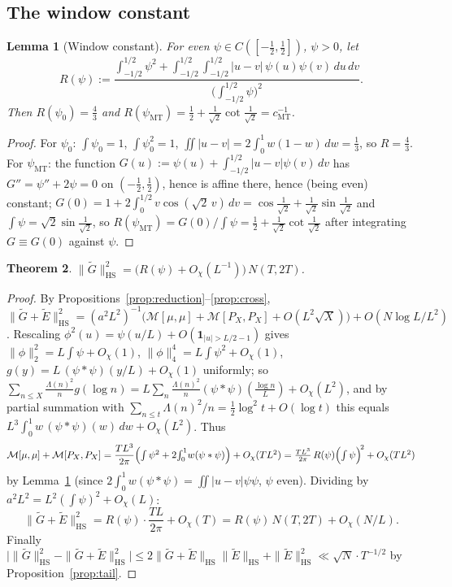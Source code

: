 \documentclass[11pt]{amsart}
\newtheorem{theorem}{Theorem}[section]
\newtheorem{lemma}[theorem]{Lemma}
\theoremstyle{definition}
\theoremstyle{remark}
\numberwithin{equation}{section}
\newcommand{\Gt}{\widetilde{G}}
\newcommand{\Et}{\widetilde{E}}
\newcommand{\one}{\mathbf 1}
\newcommand{\dd}{\,d}
\newcommand{\HS}{\mathrm{HS}}
\begin{document}
\subsection{The window constant}
\begin{lemma}[Window constant]\label{lem:Rpsi}
For even $\psi\in C([-\tfrac12,\tfrac12])$, $\psi>0$, let
\begin{equation}\label{eq:Rpsi}
R(\psi):=\frac{\int_{-1/2}^{1/2}\psi^2+\int_{-1/2}^{1/2}\!\!\int_{-1/2}^{1/2}|u-v|\,\psi(u)\psi(v)\dd u\dd v}{\bigl(\int_{-1/2}^{1/2}\psi\bigr)^2}.
\end{equation}
Then $R(\psi_0)=\tfrac43$ and $R(\psi_{\mathrm{MT}})=\tfrac12+\tfrac1{\sqrt2}\cot\tfrac1{\sqrt2}=c_{\mathrm{MT}}^{-1}$.
\end{lemma}
\begin{proof}
For $\psi_0$: $\int\psi_0=1$, $\int\psi_0^2=1$, $\iint|u-v|=2\int_0^1 w(1-w)\dd w=\tfrac13$, so $R=\tfrac43$. For $\psi_{\mathrm{MT}}$: the function $G(u):=\psi(u)+\int_{-1/2}^{1/2}|u-v|\psi(v)\dd v$ has $G''=\psi''+2\psi=0$ on $(-\tfrac12,\tfrac12)$, hence is affine there, hence (being even) constant; $G(0)=1+2\int_0^{1/2}v\cos(\sqrt2\,v)\dd v=\cos\tfrac1{\sqrt2}+\tfrac1{\sqrt2}\sin\tfrac1{\sqrt2}$ and $\int\psi=\sqrt2\sin\tfrac1{\sqrt2}$, so $R(\psi_{\mathrm{MT}})=G(0)/\!\int\psi=\tfrac12+\tfrac1{\sqrt2}\cot\tfrac1{\sqrt2}$ after integrating $G\equiv G(0)$ against $\psi$.
\end{proof}

\begin{theorem}\label{thm:HS}
$\|\Gt\|_{\HS}^2=\bigl(R(\psi)+O_\chi(L^{-1})\bigr)\,N(T,2T)$.
\end{theorem}
\begin{proof}
By Propositions~\ref{prop:reduction}--\ref{prop:cross}, $\|\Gt+\Et\|_{\HS}^2=(a^2L^2)^{-1}\bigl(\mathcal M[\mu,\mu]+\mathcal M[P_X,P_X]+O(L^2\sqrt X)\bigr)+O(N\log L/L^2)$. Rescaling $\phi^2(u)=\psi(u/L)+O(\one_{|u|>L/2-1})$ gives $\|\phi\|_2^2=L\!\int\psi+O_\chi(1)$, $\|\phi\|_4^4=L\!\int\psi^2+O_\chi(1)$, $g(y)=L\,(\psi*\psi)(y/L)+O_\chi(1)$ uniformly; so $\sum_{n\le X}\tfrac{\Lambda(n)^2}ng(\log n)=L\sum_n\tfrac{\Lambda(n)^2}n(\psi*\psi)(\tfrac{\log n}L)+O_\chi(L^2)$, and by partial summation with $\sum_{n\le t}\Lambda(n)^2/n=\tfrac12\log^2t+O(\log t)$ this equals $L^3\!\int_0^1\!w\,(\psi*\psi)(w)\dd w+O_\chi(L^2)$. Thus
\[
\mathcal M[\mu,\mu]+\mathcal M[P_X,P_X]
=\frac{TL^3}{2\pi}\Bigl(\textstyle\int\psi^2+2\!\int_0^1\!w(\psi*\psi)\Bigr)+O_\chi(TL^2)
=\frac{TL^3}{2\pi}\,R(\psi)\Bigl(\textstyle\int\psi\Bigr)^{\!2}+O_\chi(TL^2)
\]
by Lemma~\ref{lem:Rpsi} (since $2\int_0^1w(\psi*\psi)=\iint|u-v|\psi\psi$, $\psi$ even). Dividing by $a^2L^2=L^2(\int\psi)^2+O_\chi(L)$:
\[
\|\Gt+\Et\|_{\HS}^2=R(\psi)\cdot\frac{TL}{2\pi}+O_\chi(T)=R(\psi)\,N(T,2T)+O_\chi(N/L).
\]
Finally $\bigl|\|\Gt\|_{\HS}^2-\|\Gt+\Et\|_{\HS}^2\bigr|\le2\|\Gt+\Et\|_{\HS}\|\Et\|_{\HS}+\|\Et\|_{\HS}^2\ll\sqrt N\cdot T^{-1/2}$ by Proposition~\ref{prop:tail}.
\end{proof}
\end{document}

